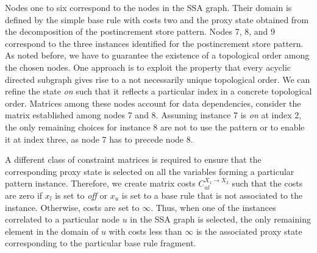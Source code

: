 Nodes one to six correspond to the nodes in the SSA graph. Their
domain is defined by the simple base rule with costs two and the proxy
state obtained from the decomposition of the postincrement store
pattern. Nodes 7, 8, and 9 correspond to the three instances
identified for the postincrement store pattern. As noted before, we
have to guarantee the existence of a topological order among the
chosen nodes.  One approach is to exploit the property that every
acyclic directed subgraph gives rise to a not necessarily unique
topological order.  We can refine the state \textit{on} such that it
reflects a particular index in a concrete topological order. Matrices
among these nodes account for data dependencies, \eg consider the
matrix established among nodes 7 and 8. Assuming instance 7 is
\textit{on} at index 2, the only remaining choices for instance 8 are
not to use the pattern or to enable it at index three, as node 7 has
to precede node 8.

A different class of constraint matrices is required to ensure that
the corresponding proxy state is selected on all the variables forming
a particular pattern instance. Therefore, we create matrix costs
$C^{X_1 \rightarrow X_2}_{ul}$ such that the costs are zero if $x_l$
is set to \textit{off\/} or $x_u$ is set to a base rule that is not
associated to the instance. Otherwise, costs are set to $\infty$.
Thus, when one of the instances correlated to a particular node $u$ in
the SSA graph is selected, the only remaining element in the domain of
$u$ with costs less than $\infty$ is the associated proxy state
corresponding to the particular base rule fragment.

